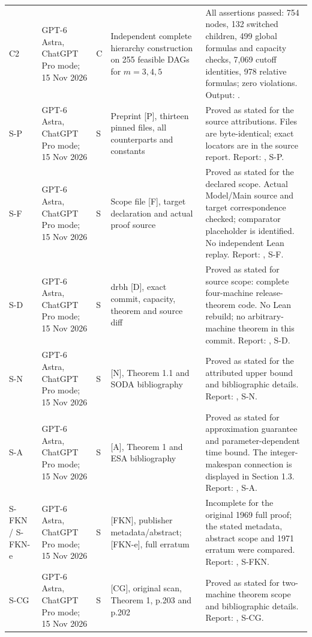\documentclass[11pt,a4paper]{article}
\theoremstyle{plain}
\theoremstyle{definition}
\begin{document}
{\begin{longtable}{@{}L{1.0cm}L{2.8cm}L{0.7cm}L{3.8cm}L{6.0cm}@{}}
C2 & GPT-6 Astra, ChatGPT Pro mode; 15 Nov 2026 & C & Independent complete hierarchy construction on 255 feasible DAGs for $m=3,4,5$ & All assertions passed: 754 nodes, 132 switched children, 499 global formulas and capacity checks, 7,069 cutoff identities, 978 relative formulas; zero violations. Output: .\\[3pt]
S-P & GPT-6 Astra, ChatGPT Pro mode; 15 Nov 2026 & S & Preprint [P], thirteen pinned files, all counterparts and constants & Proved as stated for the source attributions. Files are byte-identical; exact locators are in the source report. Report: , S-P.\\[3pt]
S-F & GPT-6 Astra, ChatGPT Pro mode; 15 Nov 2026 & S & Scope file [F], target declaration and actual proof source & Proved as stated for the declared scope. Actual Model/Main source and target correspondence checked; comparator placeholder is identified. No independent Lean replay. Report: , S-F.\\[3pt]
S-D & GPT-6 Astra, ChatGPT Pro mode; 15 Nov 2026 & S & drbh [D], exact commit, capacity, theorem and source diff & Proved as stated for source scope: complete four-machine release-theorem code. No Lean rebuild; no arbitrary-machine theorem in this commit. Report: , S-D.\\[3pt]
S-N & GPT-6 Astra, ChatGPT Pro mode; 15 Nov 2026 & S & [N], Theorem 1.1 and SODA bibliography & Proved as stated for the attributed upper bound and bibliographic details. Report: , S-N.\\[3pt]
S-A & GPT-6 Astra, ChatGPT Pro mode; 15 Nov 2026 & S & [A], Theorem 1 and ESA bibliography & Proved as stated for approximation guarantee and parameter-dependent time bound. The integer-makespan connection is displayed in Section 1.3. Report: , S-A.\\[3pt]
S-FKN / S-FKN-e & GPT-6 Astra, ChatGPT Pro mode; 15 Nov 2026 & S & [FKN], publisher metadata/abstract; [FKN-e], full erratum & Incomplete for the original 1969 full proof; the stated metadata, abstract scope and 1971 erratum were compared. Report: , S-FKN.\\[3pt]
S-CG & GPT-6 Astra, ChatGPT Pro mode; 15 Nov 2026 & S & [CG], original scan, Theorem 1, p.203 and p.202 & Proved as stated for two-machine theorem scope and bibliographic details. Report: , S-CG.\\[3pt]

\end{longtable}}
\end{document}

